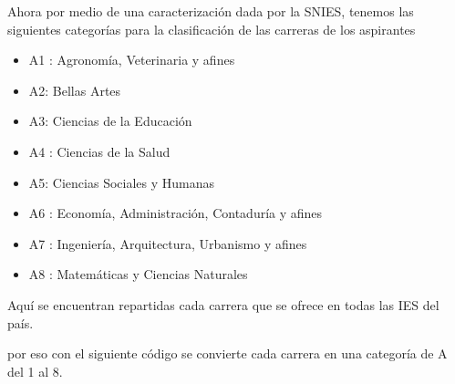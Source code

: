 \documentclass[
]{article}
\providecommand{\tightlist}{%
  \setlength{\itemsep}{0pt}\setlength{\parskip}{0pt}}
\begin{document}
Ahora por medio de una caracterización dada por la SNIES, tenemos las
siguientes categorías para la clasificación de las carreras de los
aspirantes

\begin{itemize}
\tightlist
\item
  A1 : Agronomía, Veterinaria y afines
\item
  A2: Bellas Artes
\item
  A3: Ciencias de la Educación
\item
  A4 : Ciencias de la Salud
\item
  A5: Ciencias Sociales y Humanas
\item
  A6 : Economía, Administración, Contaduría y afines
\item
  A7 : Ingeniería, Arquitectura, Urbanismo y afines
\item
  A8 : Matemáticas y Ciencias Naturales
\end{itemize}

Aquí se encuentran repartidas cada carrera que se ofrece en todas las
IES del país.

por eso con el siguiente código se convierte cada carrera en una
categoría de A del 1 al 8.
\end{document}
